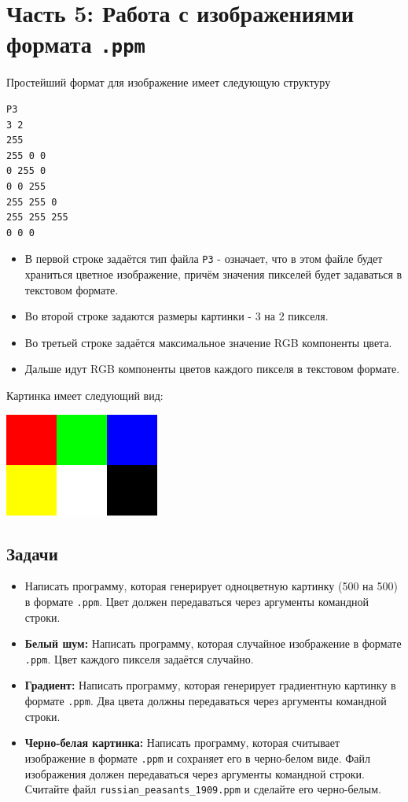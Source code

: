 \documentclass{article}
\begin{document}
\section*{Часть 5: Работа с изображениями формата \texttt{.ppm}}
Простейший формат для изображение имеет следующую структуру
\begin{verbatim}
P3
3 2
255
255 0 0 
0 255 0  
0 0 255 
255 255 0 
255 255 255 
0 0 0
\end{verbatim}
\begin{itemize}
\item В первой строке задаётся тип файла \texttt{P3} - означает, что в этом файле будет храниться цветное изображение, причём значения пикселей будет задаваться в текстовом формате.
\item Во второй строке задаются размеры картинки - 3 на 2 пикселя.
\item Во третьей строке задаётся максимальное значение RGB компоненты цвета.
\item Дальше идут RGB компоненты цветов каждого пикселя в текстовом формате.
\end{itemize}
Картинка имеет следующий вид:
\begin{center}
\includegraphics[scale=0.5]{../images/tiny.png}
\end{center}

\subsection*{Задачи}
\begin{itemize}
\item Написать программу, которая генерирует одноцветную картинку (500 на 500) в формате \texttt{.ppm}. Цвет должен передаваться через аргументы командной строки.
\item \textbf{Белый шум:} Написать программу, которая случайное изображение в формате \texttt{.ppm}. Цвет каждого пикселя задаётся случайно.
\item \textbf{Градиент:} Написать программу, которая генерирует градиентную картинку в формате \texttt{.ppm}. Два цвета должны передаваться через аргументы командной строки.
\item \textbf{Черно-белая картинка:} Написать программу, которая считывает изображение в формате \texttt{.ppm} и сохраняет его в черно-белом виде. Файл изображения должен передаваться через аргументы командной строки. Считайте файл \texttt{russian\_peasants\_1909.ppm} и сделайте его черно-белым.
\end{itemize}
\end{document}
